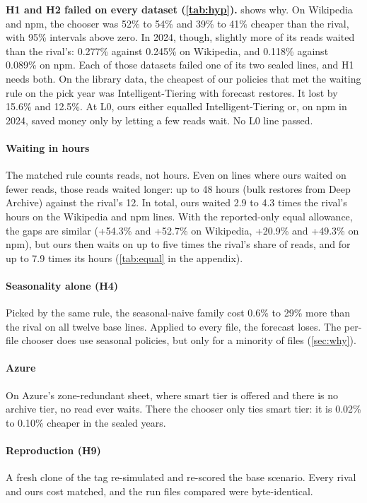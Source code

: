 \documentclass[11pt]{article}
\begin{document}
\textbf{H1 and H2 failed on every dataset (\cref{tab:hyp}).}  shows why. On Wikipedia and npm, the chooser was 52\% to 54\% and 39\% to 41\% cheaper than the rival, with 95\% intervals above zero. In 2024, though, slightly more of its reads waited than the rival's: 0.277\% against 0.245\% on Wikipedia, and 0.118\% against 0.089\% on npm. Each of those datasets failed one of its two sealed lines, and H1 needs both. On the library data, the cheapest of our policies that met the waiting rule on the pick year was Intelligent-Tiering with forecast restores. It lost by 15.6\% and 12.5\%. At L0, ours either equalled Intelligent-Tiering or, on npm in 2024, saved money only by letting a few reads wait. No L0 line passed.

\paragraph{Waiting in hours} The matched rule counts reads, not hours. Even on lines where ours waited on fewer reads, those reads waited longer: up to 48 hours (bulk restores from Deep Archive) against the rival's 12. In total, ours waited 2.9 to 4.3 times the rival's hours on the Wikipedia and npm lines. With the reported-only equal allowance, the gaps are similar (+54.3\% and +52.7\% on Wikipedia, +20.9\% and +49.3\% on npm), but ours then waits on up to five times the rival's share of reads, and for up to 7.9 times its hours (\cref{tab:equal} in the appendix).

\paragraph{Seasonality alone (H4)} Picked by the same rule, the seasonal-naive family cost 0.6\% to 29\% more than the rival on all twelve base lines. Applied to every file, the forecast loses. The per-file chooser does use seasonal policies, but only for a minority of files (\cref{sec:why}).

\paragraph{Azure} On Azure's zone-redundant sheet, where smart tier is offered and there is no archive tier, no read ever waits. There the chooser only ties smart tier: it is 0.02\% to 0.10\% cheaper in the sealed years.

\paragraph{Reproduction (H9)} A fresh clone of the tag re-simulated and re-scored the base scenario. Every rival and ours cost matched, and the run files compared were byte-identical.
\end{document}
